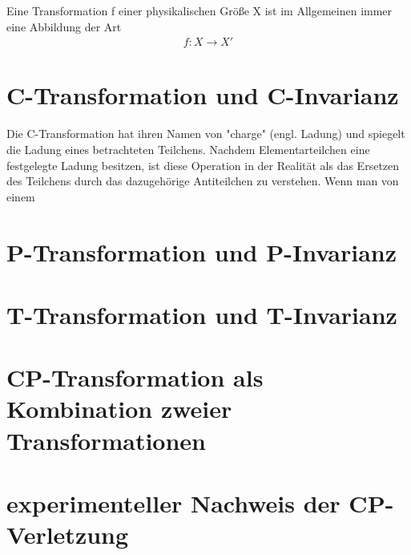 \documentclass[12pt,a4paper]{scrartcl}
\numberwithin{equation}{section}
\begin{document}
Eine Transformation f einer physikalischen Größe X ist im Allgemeinen immer eine Abbildung der Art
\begin{align}
    f: X \to X'
\end{align}


  \newpage  %

  \section{C-Transformation und C-Invarianz}

Die C-Transformation hat ihren Namen von "charge" (engl. Ladung) und spiegelt die Ladung eines betrachteten Teilchens. Nachdem Elementarteilchen eine festgelegte Ladung besitzen, ist diese Operation in der Realität als das Ersetzen des Teilchens durch das dazugehörige Antiteilchen zu verstehen. Wenn man von einem

  \newpage  %

  \section{P-Transformation und P-Invarianz}

  \newpage  %

  \section{T-Transformation und T-Invarianz}

  \newpage  %

  \section{CP-Transformation als Kombination zweier Transformationen}

  \newpage  %

  \section{experimenteller Nachweis der CP-Verletzung}
\end{document}
